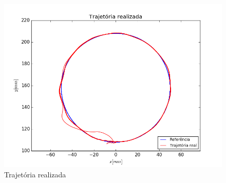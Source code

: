 \documentclass[]{politex}
\begin{document}
\begin{figure}[H]
	\centering
	\includegraphics[scale=0.39]{../../../Experimental/Aquisicoes/SMCx_circulo/xy.png}  
	\caption{Trajetória realizada}
	\label{fig:SMCx_circulo_xy}
\end{figure}
\end{document}
